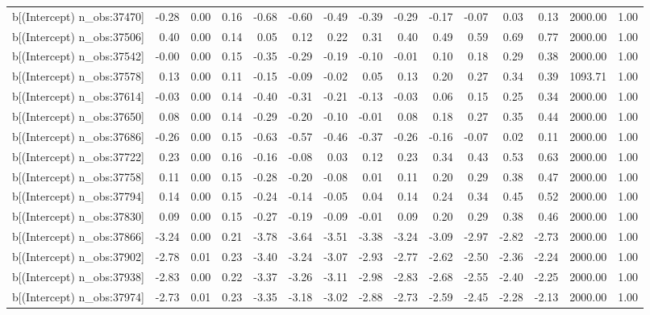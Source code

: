 \begin{table}[ht]
\begin{tabular}{rrrrrrrrrrrrrrr}
  b[(Intercept) n\_obs:37470] & -0.28 & 0.00 & 0.16 & -0.68 & -0.60 & -0.49 & -0.39 & -0.29 & -0.17 & -0.07 & 0.03 & 0.13 & 2000.00 & 1.00 \\ 
  b[(Intercept) n\_obs:37506] & 0.40 & 0.00 & 0.14 & 0.05 & 0.12 & 0.22 & 0.31 & 0.40 & 0.49 & 0.59 & 0.69 & 0.77 & 2000.00 & 1.00 \\ 
  b[(Intercept) n\_obs:37542] & -0.00 & 0.00 & 0.15 & -0.35 & -0.29 & -0.19 & -0.10 & -0.01 & 0.10 & 0.18 & 0.29 & 0.38 & 2000.00 & 1.00 \\ 
  b[(Intercept) n\_obs:37578] & 0.13 & 0.00 & 0.11 & -0.15 & -0.09 & -0.02 & 0.05 & 0.13 & 0.20 & 0.27 & 0.34 & 0.39 & 1093.71 & 1.00 \\ 
  b[(Intercept) n\_obs:37614] & -0.03 & 0.00 & 0.14 & -0.40 & -0.31 & -0.21 & -0.13 & -0.03 & 0.06 & 0.15 & 0.25 & 0.34 & 2000.00 & 1.00 \\ 
  b[(Intercept) n\_obs:37650] & 0.08 & 0.00 & 0.14 & -0.29 & -0.20 & -0.10 & -0.01 & 0.08 & 0.18 & 0.27 & 0.35 & 0.44 & 2000.00 & 1.00 \\ 
  b[(Intercept) n\_obs:37686] & -0.26 & 0.00 & 0.15 & -0.63 & -0.57 & -0.46 & -0.37 & -0.26 & -0.16 & -0.07 & 0.02 & 0.11 & 2000.00 & 1.00 \\ 
  b[(Intercept) n\_obs:37722] & 0.23 & 0.00 & 0.16 & -0.16 & -0.08 & 0.03 & 0.12 & 0.23 & 0.34 & 0.43 & 0.53 & 0.63 & 2000.00 & 1.00 \\ 
  b[(Intercept) n\_obs:37758] & 0.11 & 0.00 & 0.15 & -0.28 & -0.20 & -0.08 & 0.01 & 0.11 & 0.20 & 0.29 & 0.38 & 0.47 & 2000.00 & 1.00 \\ 
  b[(Intercept) n\_obs:37794] & 0.14 & 0.00 & 0.15 & -0.24 & -0.14 & -0.05 & 0.04 & 0.14 & 0.24 & 0.34 & 0.45 & 0.52 & 2000.00 & 1.00 \\ 
  b[(Intercept) n\_obs:37830] & 0.09 & 0.00 & 0.15 & -0.27 & -0.19 & -0.09 & -0.01 & 0.09 & 0.20 & 0.29 & 0.38 & 0.46 & 2000.00 & 1.00 \\ 
  b[(Intercept) n\_obs:37866] & -3.24 & 0.00 & 0.21 & -3.78 & -3.64 & -3.51 & -3.38 & -3.24 & -3.09 & -2.97 & -2.82 & -2.73 & 2000.00 & 1.00 \\ 
  b[(Intercept) n\_obs:37902] & -2.78 & 0.01 & 0.23 & -3.40 & -3.24 & -3.07 & -2.93 & -2.77 & -2.62 & -2.50 & -2.36 & -2.24 & 2000.00 & 1.00 \\ 
  b[(Intercept) n\_obs:37938] & -2.83 & 0.00 & 0.22 & -3.37 & -3.26 & -3.11 & -2.98 & -2.83 & -2.68 & -2.55 & -2.40 & -2.25 & 2000.00 & 1.00 \\ 
  b[(Intercept) n\_obs:37974] & -2.73 & 0.01 & 0.23 & -3.35 & -3.18 & -3.02 & -2.88 & -2.73 & -2.59 & -2.45 & -2.28 & -2.13 & 2000.00 & 1.00 \\ 

\end{tabular}
\end{table}
